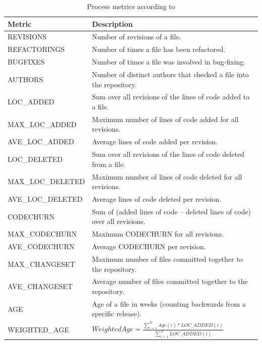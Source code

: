 \begin{table}[t]
\centering
\caption{Process metrics according to \cite{Moser2008}}
\label{tab:metrics-moser}
\begin{tabular}{@{}ll@{}}
\toprule
Metric            & Description                                                                           \\ \midrule
REVISIONS         & Number of revisions of a file.                                                        \\
REFACTORINGS      & Number of times a file has been refactored.                                           \\
BUGFIXES          & Number of times a file was involved in bug-fixing.                                    \\
AUTHORS           & Number of distinct authors that checked a file into the repository.                   \\
LOC\_ADDED        & Sum over all revisions of the lines of code added to a file.                          \\
MAX\_LOC\_ADDED   & Maximum number of lines of code added for all revisions.                              \\
AVE\_LOC\_ADDED   & Average lines of code added per revision.                                             \\
LOC\_DELETED      & Sum over all revisions of the lines of code deleted from a file.                      \\
MAX\_LOC\_DELETED & Maximum number of lines of code deleted for all revisions.                            \\
AVE\_LOC\_DELETED & Average lines of code deleted per revision.                                           \\
CODECHURN         & Sum of (added lines of code – deleted lines of code) over all revisions.              \\
MAX\_CODECHURN    & Maximum CODECHURN for all revisions.                                                  \\
AVE\_CODECHURN    & Average CODECHURN per revision.                                                       \\
MAX\_CHANGESET    & Maximum number of files committed together to the repository.                         \\
AVE\_CHANGESET    & Average number of files committed together to the repository.                         \\
AGE               & Age of a file in weeks (counting backwards from a specific release).                  \\
WEIGHTED\_AGE     & $Weighted Age = \frac{\sum_{i=1}^N Age(i)*LOC\_ADDED(i)}{\sum_{i=1}^N LOC\_ADDED(i)}$ \\ \bottomrule
\end{tabular}
\end{table}

